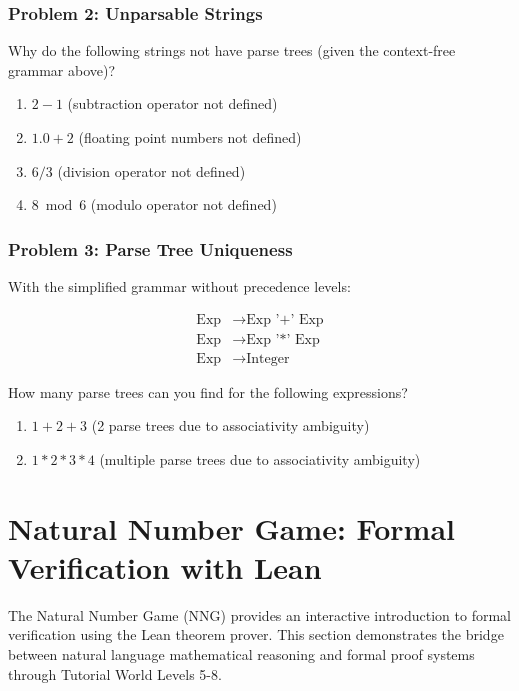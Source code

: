 \documentclass{article}
\theoremstyle{plain}
\theoremstyle{definition}
\theoremstyle{remark}
\begin{document}
\subsubsection{Problem 2: Unparsable Strings}

Why do the following strings not have parse trees (given the context-free grammar above)?

\begin{enumerate}[label=(\alph*)]
    \item $2-1$ (subtraction operator not defined)
    \item $1.0+2$ (floating point numbers not defined)
    \item $6/3$ (division operator not defined)
    \item $8 \bmod 6$ (modulo operator not defined)
\end{enumerate}

\subsubsection{Problem 3: Parse Tree Uniqueness}

With the simplified grammar without precedence levels:

\begin{align}
\text{Exp} &\to \text{Exp '+' Exp} \\
\text{Exp} &\to \text{Exp '*' Exp} \\
\text{Exp} &\to \text{Integer}
\end{align}

How many parse trees can you find for the following expressions?

\begin{enumerate}[label=(\alph*)]
    \item $1+2+3$ (2 parse trees due to associativity ambiguity)
    \item $1*2*3*4$ (multiple parse trees due to associativity ambiguity)
\end{enumerate}

\section{Natural Number Game: Formal Verification with Lean}

The Natural Number Game (NNG) provides an interactive introduction to formal verification using the Lean theorem prover. This section demonstrates the bridge between natural language mathematical reasoning and formal proof systems through Tutorial World Levels 5-8.
\end{document}
